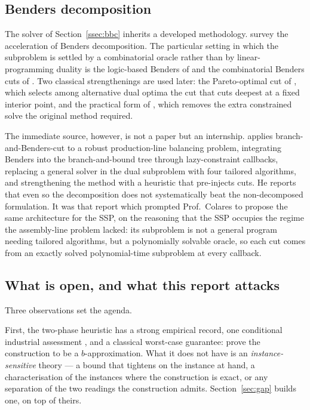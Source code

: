 \subsection{Benders decomposition}\label{ssec:sota-benders}

The solver of Section~\ref{ssec:bbc} inherits a developed methodology.
\citet{Rahmaniani2017} survey the acceleration of Benders decomposition. The
particular setting in which the subproblem is settled by a combinatorial oracle
rather than by linear-programming duality is the logic-based Benders of
\citet{Hooker2003} and the combinatorial Benders cuts of \citet{Codato2006}. Two
classical strengthenings are used later: the Pareto-optimal cut of
\citet{MagnantiWong1981}, which selects among alternative dual optima the cut that
cuts deepest at a fixed interior point, and the practical form of
\citet{Papadakos2008}, which removes the extra constrained solve the original method
required.

The immediate source, however, is not a paper but an internship. \citet{Kashou2025}
applies branch-and-Benders-cut to a robust production-line balancing problem,
integrating Benders into the branch-and-bound tree through lazy-constraint callbacks,
replacing a general solver in the dual subproblem with four tailored algorithms, and
strengthening the method with a heuristic that pre-injects cuts. He reports that even
so the decomposition does not systematically beat the non-decomposed formulation. It
was that report which prompted Prof.~Colares to propose the same architecture for the
SSP, on the reasoning that the SSP occupies the regime the assembly-line problem
lacked: its subproblem is not a general program needing tailored algorithms, but a
polynomially solvable oracle, so each cut comes from an exactly solved polynomial-time
subproblem at every
callback.

\subsection{What is open, and what this report attacks}\label{ssec:sota-open}

Three observations set the agenda.

First, the two-phase heuristic has a strong empirical record, one conditional
industrial assessment \citep{Burger2015}, and a classical worst-case guarantee:
\citet{CramaKlundert1999} prove the construction to be a $b$-approximation. What it does
not have is an \emph{instance-sensitive} theory --- a bound that tightens on the
instance at hand, a characterisation of the instances where the construction is exact,
or any separation of the two readings the construction admits.
Section~\ref{sec:gap} builds one, on top of theirs.

